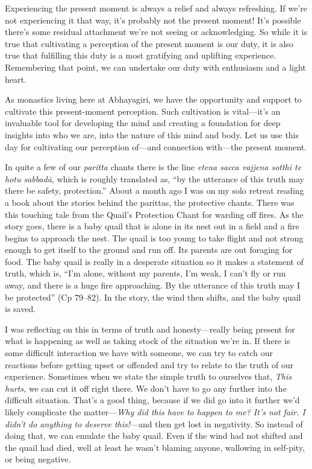 Experiencing the present moment is always a relief and always 
refreshing. If we're not experiencing it that way, it's probably not 
the present moment! It's possible there's some residual attachment 
we're not seeing or acknowledging. So while it is true that cultivating 
a perception of the present moment is our duty, it is also true that 
fulfilling this duty is a most gratifying and uplifting experience. 
Remembering that point, we can undertake our duty with enthusiasm and a 
light heart.

As monastics living here at Abhayagiri, we have the opportunity and 
support to cultivate this present-moment perception. Such cultivation 
is vital---it's an invaluable tool for developing the mind and creating 
a foundation for deep insights into who we are, into the nature of this 
mind and body. Let us use this day for cultivating our perception 
of---and connection with---the present moment.


In quite a few of our \emph{paritta} chants there is the line 
\emph{etena sacca vajjena sotthi te hotu sabbadā}, which is roughly 
translated as, ``by the utterance of this truth may there be safety, 
protection.'' About a month ago I was on my solo retreat reading a book 
about the stories behind the parittas, the protective chants. There was 
this touching tale from the Quail's Protection Chant for warding off 
fires. As the story goes, there is a baby quail that is alone in its 
nest out in a field and a fire begins to approach the nest. The quail 
is too young to take flight and not strong enough to get itself to the 
ground and run off. Its parents are out foraging for food. The baby 
quail is really in a desperate situation so it makes a statement of 
truth, which is, ``I'm alone, without my parents, I'm weak, I can't fly 
or run away, and there is a huge fire approaching. By the utterance of 
this truth may I be protected'' (Cp 79–82). In the story, the wind 
then shifts, and the baby quail is saved.

I was reflecting on this in terms of truth and honesty---really being 
present for what is happening as well as taking stock of the situation 
we're in. If there is some difficult interaction we have with someone, 
we can try to catch our reactions before getting upset or offended and 
try to relate to the truth of our experience. Sometimes when we state 
the simple truth to ourselves that, \emph{This hurts,} we can cut it 
off right there. We don't have to go any further into the difficult 
situation. That's a good thing, because if we did go into it further 
we'd likely complicate the matter---\emph{Why did this have to happen 
to me? It's not fair. I didn't do anything to deserve this!}---and then 
get lost in negativity. So instead of doing that, we can emulate the 
baby quail. Even if the wind had not shifted and the quail had died, 
well at least he wasn't blaming anyone, wallowing in self-pity, or 
being negative.


